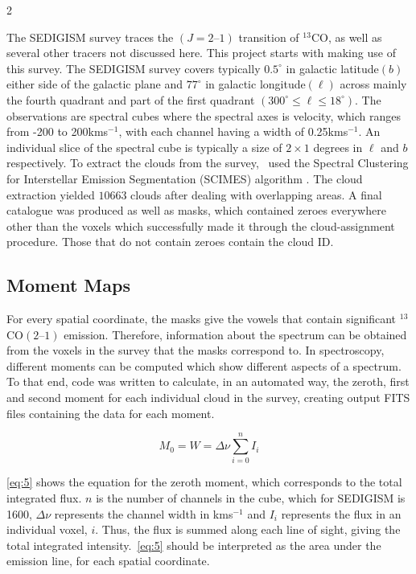 \documentclass[a4paper,11pt]{article}
\begin{document}
\begin{multicols}{2}
\par\noindent The SEDIGISM survey \parencite{SEDIGISM} traces the $(J\!=\!2\text{–}1)$ transition of $^{13}$CO, as well as several other tracers not discussed here. This project starts with making use of this survey. The SEDIGISM survey covers typically $0.5^{\circ}$ in galactic latitude$(b)$ either side of the galactic plane and $77^{\circ}$ in galactic longitude$(\ell)$ across mainly the fourth quadrant and part of the first quadrant $\left(300^{\circ}\le\ell\le18^{\circ}\right)$. The observations are spectral cubes where the spectral axes is velocity, which ranges from -200 to 200kms$^{-1}$, with each channel having a width of 0.25kms$^{-1}$. An individual slice of the spectral cube is typically a size of $2\!\times\!1$ degrees in $\ell$ and $b$ respectively. To extract the clouds from the survey,\ \cite{SEDIGISM_ana} used the Spectral Clustering for Interstellar Emission Segmentation (SCIMES) algorithm \parencite{SCIMES}. The cloud extraction yielded $10 663$ clouds after dealing with overlapping areas. A final catalogue was produced as well as masks, which contained zeroes everywhere other than the voxels which successfully made it through the cloud-assignment procedure. Those that do not contain zeroes contain the cloud ID.\

\subsection*{Moment Maps}

\par\noindent For every spatial coordinate, the masks give the vowels that contain significant $^{13}$CO$(2\text{–}1)$ emission. Therefore, information about the spectrum can be obtained from the voxels in the survey that the masks correspond to. In spectroscopy, different moments can be computed which show different aspects of a spectrum. To that end, code was written to calculate, in an automated way, the zeroth, first and second moment for each individual cloud in the survey, creating output FITS files containing the data for each moment. 

\begin{equation}
  M_0 = W = \Delta\nu\sum_{i=0}^{n} I_i\label{eq:5}
  \tag{5}
\end{equation}

\par\noindent \autoref{eq:5} shows the equation for the zeroth moment, which corresponds to the total integrated flux. $n$ is the number of channels in the cube, which for SEDIGISM is 1600, $\Delta\nu$ represents the channel width in kms$^{-1}$ and $I_i$ represents the flux in an individual voxel, $i$. Thus, the flux is summed along each line of sight, giving the total integrated intensity.\ \autoref{eq:5} should be interpreted as the area under the emission line, for each spatial coordinate.


\end{multicols}
\end{document}
